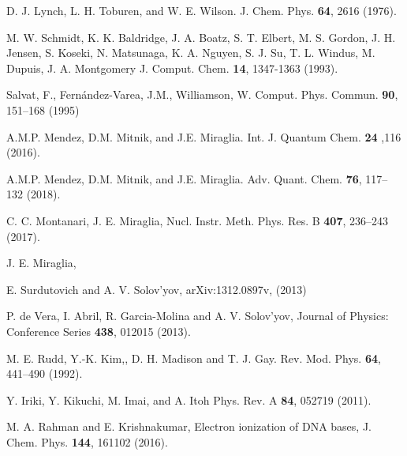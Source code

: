 \documentclass[10pt,showpacs,showkeys,twocolumn]{revtex4}
\begin{document}
\begin{thebibliography}{}
D. J. Lynch, L. H. Toburen, and W. E. Wilson. 
J. Chem. Phys. \textbf{64}, 2616 (1976).

M. W. Schmidt, K. K. Baldridge, J. A. Boatz, S. T. Elbert, M. S. Gordon, 
J. H. Jensen, S. Koseki, N. Matsunaga, K. A. Nguyen, S. J. Su, T. L. Windus, 
M. Dupuis, J. A. Montgomery 
J. Comput. Chem. \textbf{14}, 1347-1363 (1993).

Salvat, F., Fern\'andez-Varea, J.M., Williamson, W.
Comput. Phys. Commun. \textbf{90}, 151--168 (1995)

A.M.P. Mendez, D.M. Mitnik, and J.E. Miraglia.
Int. J. Quantum Chem. \textbf{24} ,116 (2016).

A.M.P. Mendez, D.M. Mitnik, and J.E. Miraglia. 
Adv. Quant. Chem. \textbf{76}, 117--132 (2018).

C. C. Montanari, J. E. Miraglia,
Nucl. Instr. Meth. Phys. Res. B \textbf{407}, 236--243 (2017).

J. E. Miraglia,

E. Surdutovich and A. V. Solov'yov, 
arXiv:1312.0897v, (2013)

P. de Vera, I. Abril, R. Garcia-Molina and A. V. Solov'yov,
Journal of Physics: Conference Series \textbf{438}, 012015 (2013).

M. E. Rudd, Y.-K. Kim,, D. H. Madison and T. J. Gay.
Rev. Mod. Phys. \textbf{64}, 441--490 (1992).

Y. Iriki, Y. Kikuchi, M. Imai, and A. Itoh
Phys. Rev. A \textbf{84}, 052719 (2011).

M. A. Rahman and E. Krishnakumar,
Electron ionization of DNA bases,
J. Chem. Phys. \textbf{144}, 161102 (2016).


\end{thebibliography}
\end{document}
